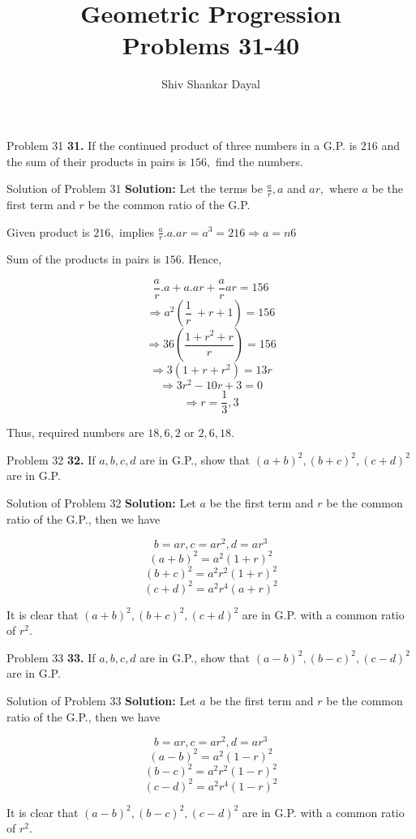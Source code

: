 \documentclass[aspectratio=1610,8pt]{beamer}
\title{Geometric Progression\\Problems 31-40}
\author[Shiv Shankar Dayal]{Shiv Shankar Dayal}
\begin{document}
\begin{frame}
       \titlepage
\end{frame}
\begin{frame}{Problem 31}
  \textbf{31.} If the continued product of three numbers in a G.P. is $216$ and
  the sum of their products in pairs is $156,$ find the numbers.
\end{frame}
\begin{frame}{Solution of Problem 31}
  \textbf{Solution:} Let the terms be $\frac{a}{r}, a$ and $ar,$ where $a$ be
  the first term and $r$ be the common ratio of the G.P.

  Given product is $216,$ implies $\frac{a}{r}.a.ar = a^3 = 216 \Rightarrow a =n6$

  Sum of the products in pairs is $156.$ Hence,

  $$\frac{a}{r}.a + a.ar + \frac{a}{r}ar = 156$$
  $$\Rightarrow a^2\left(\frac{1}{r}\ + r + 1\right) = 156$$
  $$\Rightarrow 36\left(\frac{1 + r^2 + r}{r}\right) = 156$$
  $$\Rightarrow 3(1 + r + r^2) = 13r$$
  $$\Rightarrow 3r^2 - 10r + 3 = 0$$
  $$\Rightarrow r = \frac{1}{3}, 3$$

  Thus, required numbers are $18, 6, 2$ or $2, 6, 18.$
\end{frame}
\begin{frame}{Problem 32}
  \textbf{32.} If $a, b, c, d$ are in G.P., show that $(a + b)^2, (b + c)^2, (c
  + d)^2$ are in G.P.
\end{frame}
\begin{frame}{Solution of Problem 32}
  \textbf{Solution:} Let $a$ be the first term and $r$ be the common ratio of
  the G.P., then we have

  $$b = ar, c = ar^2, d = ar^3$$
  $$(a + b)^2 = a^2(1 + r)^2$$
  $$(b + c)^2 = a^2r^2(1 + r)^2$$
  $$(c + d)^2 = a^2r^4(a + r)^2$$

  It is clear that $(a + b)^2, (b + c)^2, (c + d)^2$ are in G.P. with a common
  ratio of $r^2.$
\end{frame}
\begin{frame}{Problem 33}
  \textbf{33.} If $a, b, c, d$ are in G.P., show that $(a - b)^2, (b - c)^2, (c
  - d)^2$ are in G.P.
\end{frame}
\begin{frame}{Solution of Problem 33}
  \textbf{Solution:} Let $a$ be the first term and $r$ be the common ratio of
  the G.P., then we have

  $$b = ar, c = ar^2, d = ar^3$$
  $$(a - b)^2 = a^2(1 - r)^2$$
  $$(b - c)^2 = a^2r^2(1 - r)^2$$
  $$(c - d)^2 = a^2r^4(1 - r)^2$$

  It is clear that $(a - b)^2, (b - c)^2, (c - d)^2$ are in G.P. with a common
  ratio of $r^2.$
\end{frame}
\end{document}

